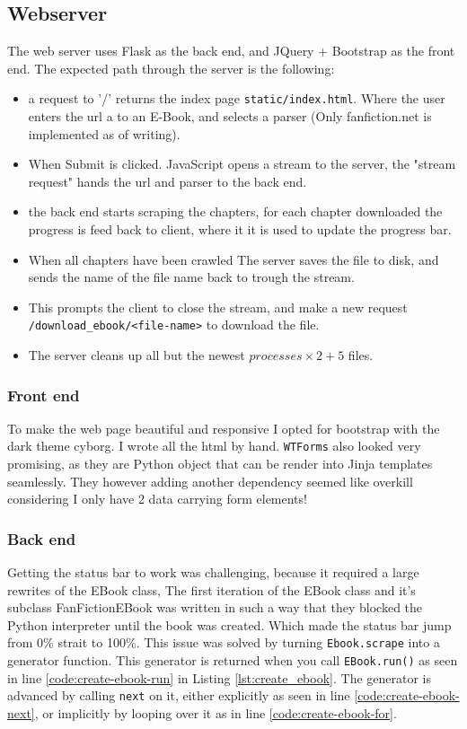 \documentclass[]{report}   %
\begin{document}
\subsection{Webserver}
The web server uses Flask as the back end, and JQuery + Bootstrap as the front
end. The expected path through the server is the following:
\begin{itemize}
	\item a request to '/' returns the index page \texttt{static/index.html}.
		Where the user enters the url a to an E-Book, and selects a parser
		(Only fanfiction.net is implemented as of writing).
	\item When Submit is clicked. JavaScript opens a stream to the server,
		the "stream request" hands the url and parser to the back end.
	\item the back end starts scraping the chapters, for each chapter downloaded
		the progress is feed back to client, where it it is used to update the
		progress bar.
	\item When all chapters have been crawled The server saves the file to
		disk, and sends the name of the file name back to trough the stream.
	\item This prompts the client to close the stream, and make a new request
		\texttt{/download\_ebook/<file-name>} to download the file.
	\item The server cleans up all but the newest $processes\times2 + 5$ files.
\end{itemize}

\subsubsection{Front end}
To make the web page beautiful and responsive I opted for bootstrap\cite{bootstrap} with the
dark theme cyborg\cite{bootstrap_cyborg}. I wrote all the html by hand.
\texttt{WTForms}\cite{wtforms} also looked very promising, as they are Python object that
can be render into Jinja templates seamlessly. They however adding another
dependency seemed like overkill considering I only have 2 data carrying form
elements!

\subsubsection{Back end}
\label{sec:backend}
Getting the status bar to work was challenging, because it required a large
rewrites of the EBook class, The first iteration of the EBook class and it's
subclass FanFictionEBook was written in such a way that they blocked the Python
interpreter until the book was created. Which made the status bar jump from 0\%
strait to 100\%. This issue was solved by turning \texttt{Ebook.scrape} into a
generator function. This generator is returned when you call
\texttt{EBook.run()} as seen in line \ref{code:create-ebook-run} in Listing
\ref{lst:create_ebook}. The generator is advanced by calling \texttt{next} on
it, either explicitly as seen in line \ref{code:create-ebook-next}, or
implicitly by looping over it as in line \ref{code:create-ebook-for}.
\end{document}
